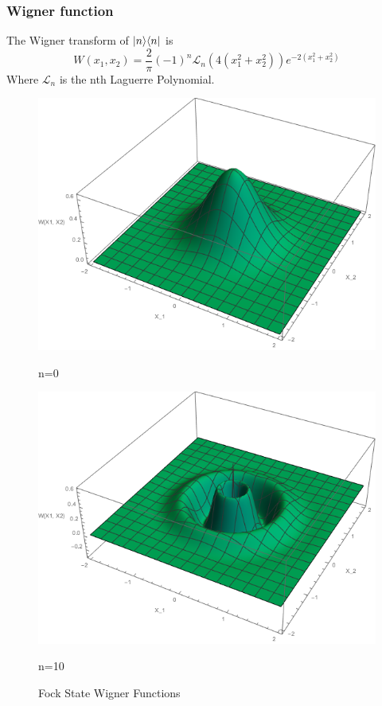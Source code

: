 \subsubsection{Wigner function}
The Wigner transform of $| n \rangle\langle n |$ is\cite[65]{Walls2008}
\begin{equation}
	W(x_1, x_2) = \frac{2}{\pi} {(-1)}^n \mathscr{L}_n(4(x_1^2+x_2^2))e^{-2(x_1^2+x_2^2)}
\end{equation}
Where $\mathscr{L}_n$ is the nth Laguerre Polynomial.
\begin{figure}[h]
	\begin{minipage}[b]{.5\linewidth}
		\centering \large \includegraphics[width=1\textwidth]{Images/W Function-n=0.png}
		\caption{n=0}\label{fig:n=0}
	\end{minipage}%
	\begin{minipage}[b]{.5\linewidth}
		\centering\large \includegraphics[width = 1\textwidth]{Images/W Function-n=10.png}
		\caption{n=10}\label{fig:n=10}
	\end{minipage}
	\caption{Fock State Wigner Functions}\label{Wfunctions}
\end{figure}


